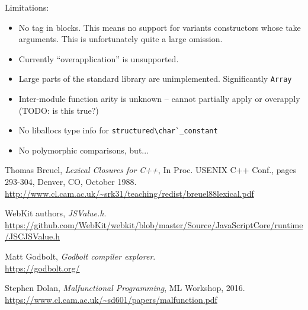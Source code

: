 \documentclass[12pt,a4paper,twoside,openright]{report}
\begin{document}
Limitations:

\begin{itemize}
  \item No tag in blocks. This means no support for variants constructors whose
    take arguments. This is unfortunately quite a large omission.
  \item Currently ``overapplication'' is unsupported.
  \item Large parts of the standard library are unimplemented. Significantly \lstinline!Array!
  \item Inter-module function arity is unknown -- cannot partially apply or overapply (TODO: is this true?)
  \item No liballocs type info for \lstinline!structured\char`_constant!
  \item No polymorphic comparisons, but...

\end{itemize}


\begin{thebibliography}{1}

  Thomas Breuel,
  \emph{Lexical Closures for C++},
  In Proc. USENIX C++ Conf., pages 293-304,
  Denver, CO, October 1988.  \\ \url{http://www.cl.cam.ac.uk/~srk31/teaching/redist/breuel88lexical.pdf}

  WebKit authors,
  \emph{JSValue.h}.
  \\ \url{https://github.com/WebKit/webkit/blob/master/Source/JavaScriptCore/runtime/JSCJSValue.h}

  Matt Godbolt,
  \emph{Godbolt compiler explorer}.
  \\ \url{https://godbolt.org/}

  Stephen Dolan,
  \emph{Malfunctional Programming},
  ML Workshop, 2016.  \\ \url{https://www.cl.cam.ac.uk/~sd601/papers/malfunction.pdf}

\end{thebibliography}

\appendix
\end{document}
